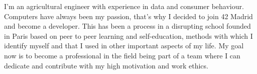 
\begin{cvparagraph}
  I'm an agricultural engineer with experience in data and consumer behaviour. Computers have always been my passion, that's why I decided to join 42 Madrid and become a developer.
  This has been a process in a disrupting school founded in Paris based on peer to peer learning and self-education, methods with which I identify myself and that I used in other important aspects of my life.
  My goal now is to become a professional in the field being part of a team where I can dedicate and contribute with my high motivation and work ethics.
\end{cvparagraph}

